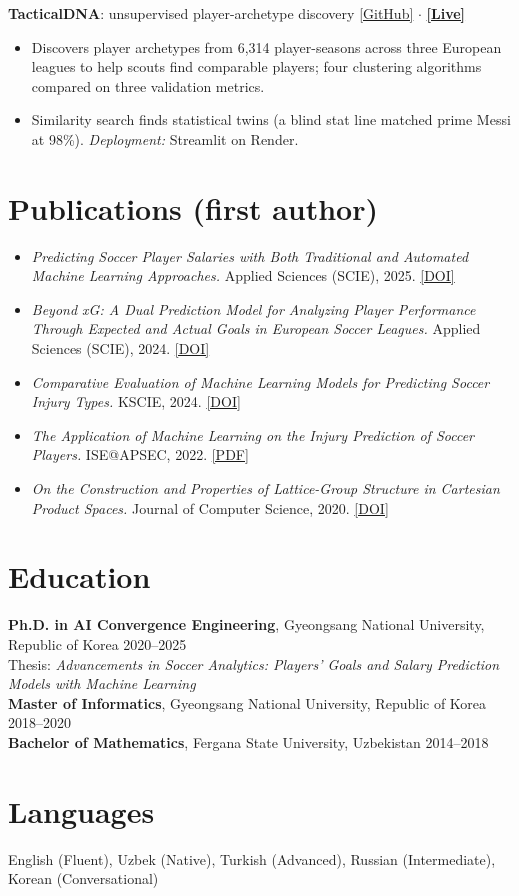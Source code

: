 \documentclass[10pt,a4paper]{article}
\begin{document}
\textbf{TacticalDNA}: unsupervised player-archetype discovery \hfill \href{https://github.com/davronbek-malikov/tactical-dna}{[GitHub]} $\cdot$ \href{https://soccer-player-clustering.onrender.com}{\textbf{[Live]}}
\begin{itemize}
    \item Discovers player archetypes from 6,314 player-seasons across three European leagues to help scouts find comparable players; four clustering algorithms compared on three validation metrics.
    \item Similarity search finds statistical twins (a blind stat line matched prime Messi at 98\%). \textit{Deployment:} Streamlit on Render.
\end{itemize}


\section*{Publications (first author)}
\begin{itemize}
    \item \textit{Predicting Soccer Player Salaries with Both Traditional and Automated Machine Learning Approaches.}
Applied Sciences (SCIE), 2025. \href{https://doi.org/10.3390/app15148108}{[DOI]}
    \item \textit{Beyond xG: A Dual Prediction Model for Analyzing Player Performance Through Expected and Actual Goals in
European Soccer Leagues.} Applied Sciences (SCIE), 2024. \href{https://doi.org/10.3390/app142210390}{[DOI]}
    \item \textit{Comparative Evaluation of Machine Learning Models for Predicting Soccer Injury Types.} KSCIE, 2024.
\href{https://doi.org/10.21289/KSIC.2024.27.2.257}{[DOI]}
    \item \textit{The Application of Machine Learning on the Injury Prediction of Soccer Players.} ISE@APSEC, 2022.
\href{https://ceur-ws.org/Vol-3362/ISE2022_short02_Malikov_Application.pdf}{[PDF]}
    \item \textit{On the Construction and Properties of Lattice-Group Structure in Cartesian Product Spaces.} Journal of
Computer Science, 2020. \href{https://doi.org/10.3844/jcssp.2020.402.421}{[DOI]}
\end{itemize}

\section*{Education}
\textbf{Ph.D. in AI Convergence Engineering}, Gyeongsang National University, Republic of Korea \hfill 2020--2025 \\
Thesis: \textit{Advancements in Soccer Analytics: Players' Goals and Salary Prediction Models with Machine Learning} \\
\textbf{Master of Informatics}, Gyeongsang National University, Republic of Korea \hfill 2018--2020 \\
\textbf{Bachelor of Mathematics}, Fergana State University, Uzbekistan \hfill 2014--2018

\section*{Languages}
English (Fluent), Uzbek (Native), Turkish (Advanced), Russian (Intermediate), Korean (Conversational)
\end{document}
